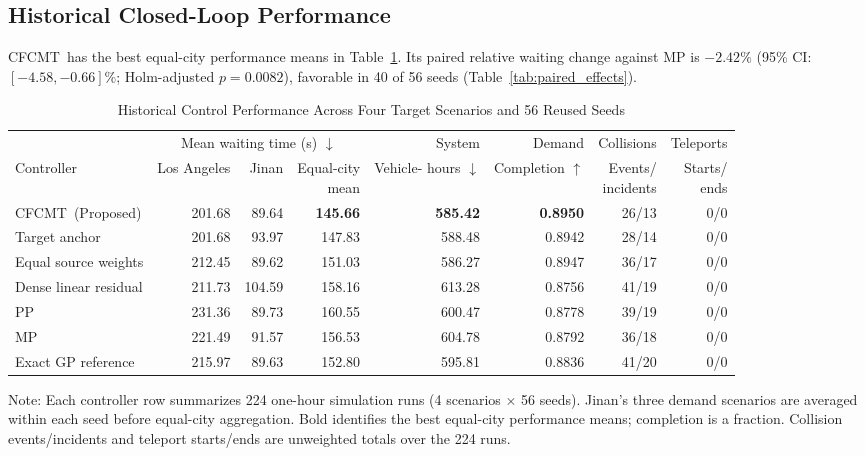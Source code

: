 \documentclass[letterpaper,journal]{IEEEtran}
\newcommand{\method}{CFCMT}
\begin{document}
\subsection{Historical Closed-Loop Performance}
\method\ has the best equal-city performance means in Table~\ref{tab:main_results}. Its paired relative waiting change against MP is $-2.42\%$ (95\% CI: $[-4.58,-0.66]\%$; Holm-adjusted $p=0.0082$), favorable in 40 of 56 seeds (Table~\ref{tab:paired_effects}).

\begin{table}[!t]
\centering
\caption{Historical Control Performance Across Four Target Scenarios and 56 Reused Seeds}
\label{tab:main_results}
\setlength{\tabcolsep}{4pt}
\begin{tabular}{lrrrrrrr}
\toprule
& \multicolumn{3}{c}{Mean waiting time (s) $\downarrow$} & System & Demand & Collisions & Teleports\\
\cmidrule(lr){2-4}
Controller & Los Angeles & Jinan & \shortstack{Equal-city\\mean} & \shortstack{Vehicle-\\hours $\downarrow$} & \shortstack{Completion\\$\uparrow$} & \shortstack{Events/\\incidents} & \shortstack{Starts/\\ends}\\
\midrule
\method\ (Proposed) & 201.68 & 89.64 & \textbf{145.66} & \textbf{585.42} & \textbf{0.8950} & 26/13 & 0/0\\
Target anchor & 201.68 & 93.97 & 147.83 & 588.48 & 0.8942 & 28/14 & 0/0\\
Equal source weights & 212.45 & 89.62 & 151.03 & 586.27 & 0.8947 & 36/17 & 0/0\\
Dense linear residual & 211.73 & 104.59 & 158.16 & 613.28 & 0.8756 & 41/19 & 0/0\\
PP & 231.36 & 89.73 & 160.55 & 600.47 & 0.8778 & 39/19 & 0/0\\
MP & 221.49 & 91.57 & 156.53 & 604.78 & 0.8792 & 36/18 & 0/0\\
Exact GP reference & 215.97 & 89.63 & 152.80 & 595.81 & 0.8836 & 41/20 & 0/0\\
\bottomrule
\end{tabular}
\vspace{3pt}
\begin{minipage}{\textwidth}\footnotesize
Note: Each controller row summarizes 224 one-hour simulation runs (4 scenarios $\times$ 56 seeds). Jinan's three demand scenarios are averaged within each seed before equal-city aggregation. Bold identifies the best equal-city performance means; completion is a fraction. Collision events/incidents and teleport starts/ends are unweighted totals over the 224 runs.
\end{minipage}
\end{table}
\end{document}
